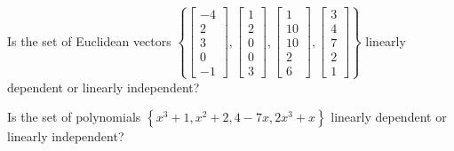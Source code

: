 \begin{applicationActivities}{1}{12}
\begin{activity}{5}
  Is the set of Euclidean vectors \(\left\{
  \begin{bmatrix}-4\\2\\3\\0\\-1\end{bmatrix},
  \begin{bmatrix}1\\2\\0\\0\\3\end{bmatrix},
  \begin{bmatrix}1\\10\\10\\2\\6\end{bmatrix},
  \begin{bmatrix}3\\4\\7\\2\\1\end{bmatrix}
  \right\}\) linearly dependent or linearly independent?
\end{activity}

\begin{activity}{10}
  Is the set of polynomials \(\left\{
  x^3+1,x^2+2,4-7x,2x^3+x
  \right\}\) linearly dependent or linearly independent?
\end{activity}

\end{applicationActivities}

